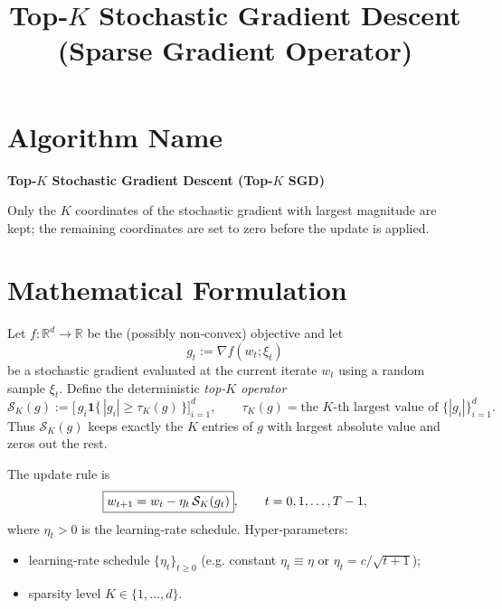 \documentclass{article}
\title{Top‑\(K\) Stochastic Gradient Descent \\ (Sparse Gradient Operator)}
\author{}
\date{}
\newcommand{\R}{\mathbb{R}}
\newcommand{\topk}[1]{\mathcal{S}_K(#1)}
\begin{document}
\maketitle

\section*{Algorithm Name}
\textbf{Top‑\(K\) Stochastic Gradient Descent (Top‑\(K\) SGD)}  

Only the \(K\) coordinates of the stochastic gradient with largest magnitude are kept; the remaining coordinates are set to zero before the update is applied.

\section*{Mathematical Formulation}
Let \(f:\R^{d}\rightarrow\R\) be the (possibly non‑convex) objective and let
\[
g_t:=\nabla f(w_t;\xi_t)
\]
be a stochastic gradient evaluated at the current iterate \(w_t\) using a random sample \(\xi_t\).  
Define the deterministic \emph{top‑\(K\) operator}
\[
\topk{g}:=\bigl[\,g_i\mathbf 1\{\,|g_i|\ge \tau_K(g)\,\}\bigr]_{i=1}^{d},
\qquad 
\tau_K(g)=\text{the }K\text{‑th largest value of }\{|g_i|\}_{i=1}^{d}.
\]
Thus \(\topk{g}\) keeps exactly the \(K\) entries of \(g\) with largest absolute value and zeros out the rest.  

The update rule is
\begin{equation}
\boxed{%
w_{t+1}=w_t-\eta_t\,\topk{g_t}},\qquad t=0,1,\dots,T-1,
\label{eq:update}
\end{equation}
where \(\eta_t>0\) is the learning‑rate schedule.  
Hyper‑parameters:
\begin{itemize}[nosep]
  \item learning‑rate schedule \(\{\eta_t\}_{t\ge0}\) (e.g. constant \(\eta_t\equiv\eta\) or \(\eta_t=c/\sqrt{t+1}\));
  \item sparsity level \(K\in\{1,\dots,d\}\).
\end{itemize}
\end{document}
